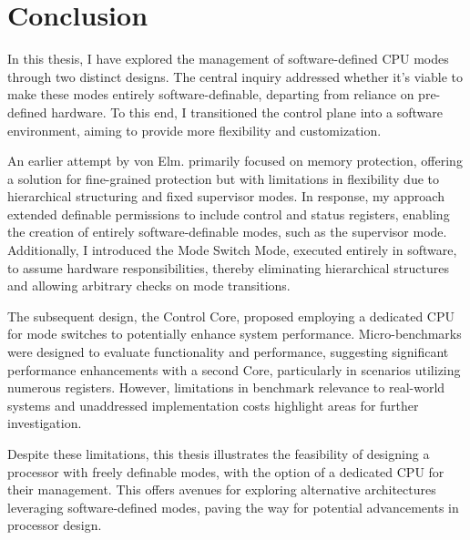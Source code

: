 \chapter{Conclusion}
In this thesis, I have explored the management of software-defined CPU modes
through two distinct designs. The central inquiry addressed whether it's viable
to make these modes entirely software-definable, departing from reliance on
pre-defined hardware. To this end, I transitioned the control plane into a
software environment, aiming to provide more flexibility and customization.\par
An earlier attempt by von Elm. \cite{Cve} primarily focused on memory protection, offering a
solution for fine-grained protection but with limitations in flexibility due to
hierarchical structuring and fixed supervisor modes. In response, my approach
extended definable permissions to include control and status registers, enabling
the creation of entirely software-definable modes, such as the supervisor mode.
Additionally, I introduced the Mode Switch Mode, executed entirely in software,
to assume hardware responsibilities, thereby eliminating hierarchical structures
and allowing arbitrary checks on mode transitions.\par
The subsequent design, the Control Core, proposed employing a dedicated CPU for
mode switches to potentially enhance system performance. Micro-benchmarks were
designed to evaluate functionality and performance, suggesting significant
performance enhancements with a second Core, particularly in scenarios utilizing
numerous registers. However, limitations in benchmark relevance to real-world
systems and unaddressed implementation costs highlight areas for further
investigation.\par
Despite these limitations, this thesis illustrates the feasibility of designing
a processor with freely definable modes, with the option of a dedicated CPU for
their management. This offers avenues for exploring alternative architectures
leveraging software-defined modes, paving the way for potential advancements in
processor design.\par